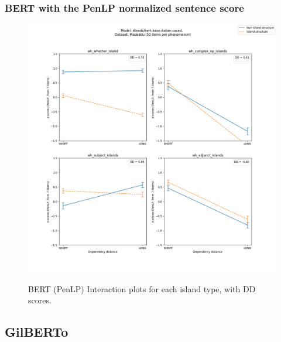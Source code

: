 \clearpage
\subsubsection{BERT with the PenLP normalized sentence score}
\begin{figure}[h]
	\centering
	\includegraphics[width=1\textwidth]{images/AppendixA/Madeddu_wh_dbmdz_bert-base-italian-cased_PenLP-zscores-likert-2022-09-17_h11m09s51.png} 
	\label{A-fig:md_bert2b_penlp}
	\caption{BERT (PenLP) Interaction plots for each island type, with DD scores.}
\end{figure}

\clearpage
\subsection{GilBERTo}

